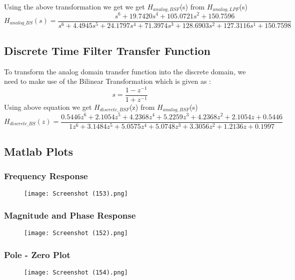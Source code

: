 \documentclass{article}
\begin{document}
Using the above transformation we get we get $H_{analog,BSF}$(s)  from $H_{analog,LPF}$(s)
\begin{equation*}
    H_{analog\_BS}(s) = \frac{s^6 + 19.7420s^4 + 105.0721s^2 + 150.7596}{s^6 + 4.4945s^5 + 24.1797s^4 + 71.3974s^3 + 128.6903s^2 + 127.3116s^1 + 150.7598}
\end{equation*}

\subsection{Discrete Time Filter Transfer Function}
To transform the analog domain transfer function into the discrete domain, we need to make use of the Bilinear Transformation which is given as :
\begin{equation*}
    s = \frac{1 - z^{-1}}{1 + z^{-1}}
\end{equation*}
Using  above  equation  we  get $H_{discrete,BSF}$(z)  from $H_{analog,BSF}$(s)
\begin{equation*}
H_{discrete\_BS}(z) = \frac{0.5446z^6 + 2.1054z^5 + 4.2368z^4 + 5.2259z^3 + 4.2368z^2 + 2.1054z + 0.5446}{1z^6 + 3.1484z^5 + 5.0575z^4 + 5.0748z^3 + 3.3056z^2 + 1.2136z + 0.1997}  
\end{equation*}


\subsection{Matlab Plots}
\subsubsection{Frequency Response}
\begin{figure}[H]
\hspace*{-2.5cm}
    \centering
    \texttt{[image: Screenshot (153).png]}
    \label{fig:my_label}
\end{figure}

\subsubsection{Magnitude and Phase Response}
\begin{figure}[H]
\hspace*{-2.5cm}
    \centering
    \texttt{[image: Screenshot (152).png]}
    \label{fig:my_label}
\end{figure}

\subsubsection{Pole - Zero Plot}
\begin{figure}[H]
\hspace*{-2.5cm}
    \centering
    \texttt{[image: Screenshot (154).png]}
    \label{fig:my_label}
\end{figure}
\end{document}
